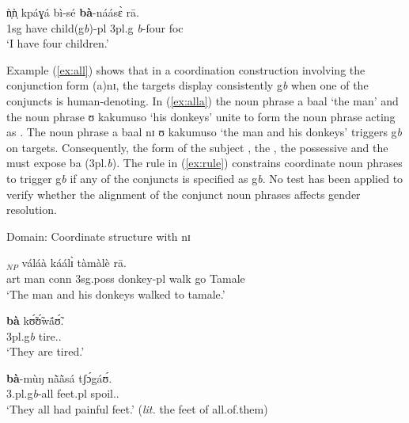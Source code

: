 \begin{exe}
\begin{exe}
\begin{exe}
\begin{exe}
\begin{exe}
\begin{exe}
\begin{exe}
\begin{exe}
\begin{exe}
\begin{exe}
\begin{exe}
\ex\label{ex:domnumH+}

\gll  ǹ̩ǹ̩   kpáɣá  bì-sé  \textbf{bà}-náásɛ̀  rā.\\
  {\sc 1sg}  {have}  {child({\sc g}{\it b})-{\sc pl}}   {{\sc 3pl.g}{\it
b}-four}  {\sc foc}\\
\glt `I have four children.'\\

\z 
 \z


Example (\ref{ex:all}) shows that in a coordination construction involving the conjunction form {\sls (a)nɪ},  the targets display consistently {\sc g}{\it b} when one of the conjuncts is human-denoting.  In (\ref{ex:alla}) the noun phrase {\sls a baal} `the man' and the noun phrase {\sls ʊ  kakumuso} `his donkeys' unite to form the noun phrase acting as .  The noun phrase  {\sls a baal nɪ ʊ kakumuso} `the man and his donkeys' triggers {\sc g}{\it b} on targets.  Consequently, the form of the subject , the , the possessive  and the  must expose  {\sls ba} ({\sc 3pl.}{\it b}). The rule in (\ref{ex:rule}) constrains coordinate noun phrases to trigger {\sc g}{\it b} if any of the conjuncts is specified as {\sc g}{\it b}. No test has been applied to verify whether the alignment of the conjunct noun phrases affects gender resolution.

\ea\label{ex:all}{\rm Domain: Coordinate structure with {\sls nɪ}}\\
\ea\label{ex:alla}

\gll  [à  báál   nɪ̀  ʊ̀ʊ̀  kààkúmò-sō]$_{NP}$  váláà  káálɪ̀  
tàmàlè rā.
\\
   {\sc art} {man} {\sc conn}  {\sc 3sg.poss} {donkey-{\sc pl}} {walk}  {go}
{Tamale} {\foc}\\
\glt `The man and his donkeys walked to {\sc tamale}.'\\

\ex\label{ex:Tamanaphor}

\gll  \textbf{bà}  kʊ̃́ʊ̃́wã́ʊ̃́.\\
    {{\sc 3pl}.{\sc g}{\it b}} tire.{\pfv}.{\foc}\\
\glt `They are tired.'\\

\ex\label{ex:Tamquant}

\gll   \textbf{bà}-mùŋ  nã̀ã̀sá tʃɔ́gáʊ́.\\
    {3.{\sc pl}.{\sc g}{\it b}-all} {feet.{\sc pl}} spoil.{\pfv}.{\foc}\\
\glt `They all had painful feet.'  (\textit{lit.} the feet of all.of.them)


\end{exe}
\end{exe}
\end{exe}
\end{exe}
\end{exe}
\end{exe}
\end{exe}
\end{exe}
\end{exe}
\end{exe}
\end{exe}
